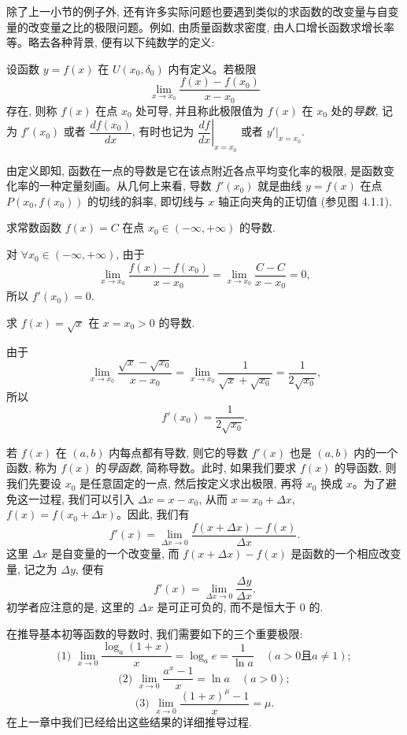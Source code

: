 除了上一小节的例子外, 还有许多实际问题也要遇到类似的求函数的改变量与自变量的改变量之比的极限问题。例如, 由质量函数求密度, 由人口增长函数求增长率等。略去各种背景, 便有以下纯数学的定义:

\begin{definition}\label{definition:ma-4-1-1}
设函数 $y=f(x)$ 在 $U(x_0,\delta_0)$ 内有定义。若极限
\[
  \lim_{x\to x_0}\frac{f(x)-f(x_0)}{x-x_0}
\]
存在, 则称 $f(x)$ 在点 $x_0$ 处可导, 并且称此极限值为 $f(x)$ 在 $x_0$ 处的\emph{导数}, 记为 $f'(x_0)$ 或者 $\dfrac{df(x_0)}{dx}$, 有时也记为 $\left.\dfrac{df}{dx}\right|_{x=x_0}$ 或者 $\left.y'\right|_{x=x_0}$.
\end{definition}

由定义即知, 函数在一点的导数是它在该点附近各点平均变化率的极限, 是函数变化率的一种定量刻画。从几何上来看, 导数 $f'(x_0)$ 就是曲线 $y=f(x)$ 在点 $P(x_0,f(x_0))$ 的切线的斜率, 即切线与 $x$ 轴正向夹角的正切值 (参见图 4.1.1).

\begin{example}\label{example:ma-4-1-1}
求常数函数 $f(x)=C$ 在点 $x_0\in(-\infty,+\infty)$ 的导数.
\end{example}


\begin{solve}
对 $\forall x_0\in(-\infty,+\infty)$, 由于
\[
  \lim_{x\to x_0}\frac{f(x)-f(x_0)}{x-x_0}
  =
  \lim_{x\to x_0}\frac{C-C}{x-x_0}=0,
\]
所以 $f'(x_0)=0$.
\end{solve}


\begin{example}\label{example:ma-4-1-2}
求 $f(x)=\sqrt{x}$ 在 $x=x_0>0$ 的导数.
\end{example}


\begin{solve}
由于
\[
  \lim_{x\to x_0}\frac{\sqrt{x}-\sqrt{x_0}}{x-x_0}
  =
  \lim_{x\to x_0}\frac1{\sqrt{x}+\sqrt{x_0}}
  =
  \frac1{2\sqrt{x_0}},
\]
所以
\[
  f'(x_0)=\frac1{2\sqrt{x_0}}.
\]

若 $f(x)$ 在 $(a,b)$ 内每点都有导数, 则它的导数 $f'(x)$ 也是 $(a,b)$ 内的一个函数, 称为 $f(x)$ 的\emph{导函数}, 简称导数。此时, 如果我们要求 $f(x)$ 的导函数, 则我们先要设 $x_0$ 是任意固定的一点, 然后按定义求出极限, 再将 $x_0$ 换成 $x$。为了避免这一过程, 我们可以引入 $\Delta x=x-x_0$, 从而 $x=x_0+\Delta x$, $f(x)=f(x_0+\Delta x)$。因此, 我们有
\[
  f'(x)=
  \lim_{\Delta x\to0}\frac{f(x+\Delta x)-f(x)}{\Delta x}.
\]
这里 $\Delta x$ 是自变量的一个改变量, 而 $f(x+\Delta x)-f(x)$ 是函数的一个相应改变量, 记之为 $\Delta y$, 便有
\[
  f'(x)=\lim_{\Delta x\to0}\frac{\Delta y}{\Delta x}.
\]
初学者应注意的是, 这里的 $\Delta x$ 是可正可负的, 而不是恒大于 $0$ 的.

在推导基本初等函数的导数时, 我们需要如下的三个重要极限:
\[
  \text{(1) }\lim_{x\to0}\frac{\log_a(1+x)}{x}
  =
  \log_a e
  =
  \frac1{\ln a}\quad(a>0\text{且}a\ne1);
\]
\[
  \text{(2) }\lim_{x\to0}\frac{a^x-1}{x}
  =
  \ln a\quad(a>0);
\]
\[
  \text{(3) }\lim_{x\to0}\frac{(1+x)^\mu-1}{x}
  =
  \mu.
\]
在上一章中我们已经给出这些结果的详细推导过程.
\end{solve}


